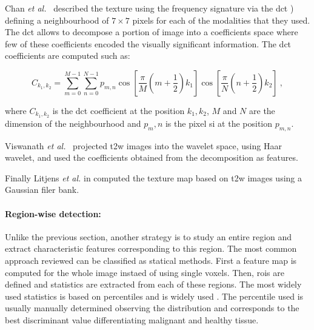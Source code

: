 Chan \textit{et al.}~\cite{Chan2003} described the texture using the frequency signature via the \acf{dct} \cite{Ahmed1974}) defining a neighbourhood of $7 \times 7$ pixels for each of the modalities that they used.
The \ac{dct} allows to decompose a portion of image into a coefficients space where few of these coefficients encoded the visually significant information.
The \ac{dct} coefficients are computed such as:

\begin{equation}
	C_{k_1,k_2} = \sum_{m=0}^{M-1} \sum_{n=0}^{N-1} p_{m,n} \cos \left[ \frac{\pi}{M} \left( m + \frac{1}{2} \right) k_1 \right] \cos \left[ \frac{\pi}{N} \left( n + \frac{1}{2} \right) k_2 \right] \ ,
\end{equation}

\noindent where $C_{k_1,k_2}$ is the \ac{dct} coefficient at the position $k_1,k_2$, $M$ and $N$ are the dimension of the neighbourhood and $p_m,n$ is the pixel \ac{si} at the position $p_{m,n}$.

Viswanath \textit{et al.}~\cite{Viswanath2012} projected \ac{t2w} images into the wavelet space, using Haar wavelet, and used the coefficients obtained from the decomposition as features.

Finally Litjens \textit{et al.} in \cite{Litjens2011} computed the texture map based on \ac{t2w} images using a Gaussian filer bank.




\paragraph{Region-wise detection:}

Unlike the previous section, another strategy is to study an entire region and extract characteristic features corresponding to this region.
The most common approach reviewed can be classified as statical methods.
First a feature map is computed for the whole image instaed of using single voxels.
Then, \acp{roi} are defined and statistics are extracted from each of these regions.
The most widely used statistics is based on percentiles and is widely used \cite{Antic2013,Litjens2011,Litjens2012,Peng2013,Tiwari2009a,Tiwari2010,Tiwari2013,Viswanath2008,Viswanath2008a,Viswanath2011,Viswanath2012,Vos2008,Vos2008a,Vos2010,Vos2012}.
The percentile used is usually manually determined observing the distribution and corresponds to the best discriminant value differentiating malignant and healthy tissue.

